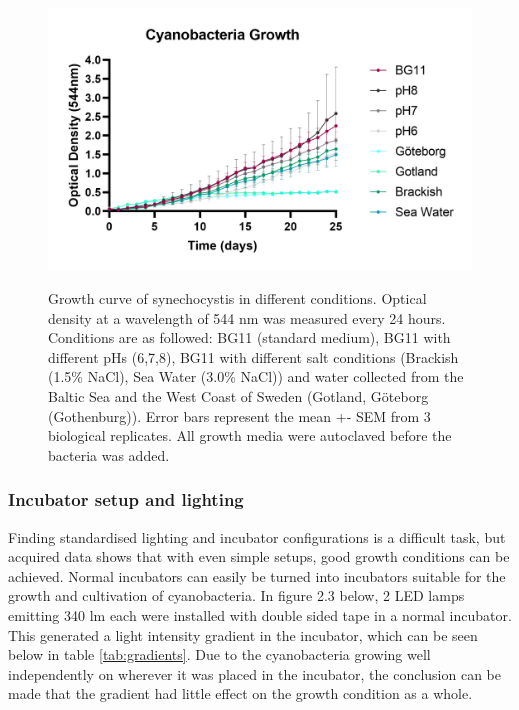 \begin{figure}[!htbp]
    \centering
    \includegraphics[width=\textwidth]{images/chap2/chap2_cyano_03.png}
    \label{fig:ch2cyano01}
    \caption{Growth curve of synechocystis in different conditions. Optical density at a wavelength of 544 nm was measured every 24 hours. Conditions are as followed: BG11 (standard medium), BG11 with different pHs (6,7,8), BG11 with different salt conditions (Brackish (1.5\% NaCl), Sea Water (3.0\% NaCl)) and water collected from the Baltic Sea and the West Coast of Sweden (Gotland, Göteborg (Gothenburg)). Error bars represent the mean +- SEM from 3 biological replicates. All growth media were autoclaved before the bacteria was added.} 
\end{figure}
\FloatBarrier
\noindent

\subsubsection{Incubator setup and lighting}
Finding standardised lighting and incubator configurations is a difficult task, but acquired data shows that with even simple setups, good growth conditions can be achieved. Normal incubators can easily be turned into incubators suitable for the growth and cultivation of cyanobacteria. In figure 2.3 below, 2 LED lamps emitting 340 lm each were installed with double sided tape in a normal incubator. This generated a light intensity gradient in the incubator, which can be seen below in table \ref{tab:gradients}. Due to the cyanobacteria growing well independently on wherever it was placed in the incubator, the conclusion can be made that the gradient had little effect on the growth condition as a whole. 

